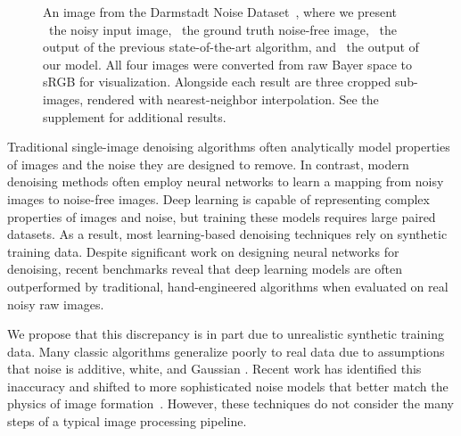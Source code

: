 \documentclass[10pt,twocolumn,letterpaper]{article}
\begin{document}
\newcommand{\teaserresultswidth}{0.472\linewidth}
\begin{figure}[t]
\begin{center}
\end{center}
  \caption{An image from the Darmstadt Noise Dataset~\cite{plotz2017cvpr}, where we present ~the noisy input image, ~the ground truth noise-free image, ~the output of the previous state-of-the-art algorithm, and ~the output of our model. All four images were converted from raw Bayer space to sRGB for visualization.
  Alongside each result are three cropped sub-images, rendered with nearest-neighbor interpolation.
  See the supplement for additional results.}
\label{fig:teaser}
\end{figure}

Traditional single-image denoising algorithms often analytically model properties of images and the noise they are designed to remove. In contrast, modern denoising methods often employ neural networks to learn a mapping from noisy images to noise-free images. Deep learning is capable of representing complex properties of images and noise, but training these models requires large paired datasets. As a result, most learning-based denoising techniques rely on synthetic training data. Despite significant work on designing neural networks for denoising, recent benchmarks \cite{anaya2014renoir,plotz2017cvpr} reveal that deep learning models are often outperformed by traditional, hand-engineered algorithms when evaluated on real noisy raw images.

We propose that this discrepancy is in part due to unrealistic synthetic training data.
Many classic algorithms generalize poorly to real data due to assumptions that noise is additive, white, and Gaussian \cite{Rudin1992,Simoncelli1996}.
Recent work has identified this inaccuracy and shifted to more sophisticated noise models that better match the physics of image formation~\cite{Liu2008,Mildenhall_2018_CVPR}. However, these techniques do not consider the many steps of a typical image processing pipeline.
\end{document}
